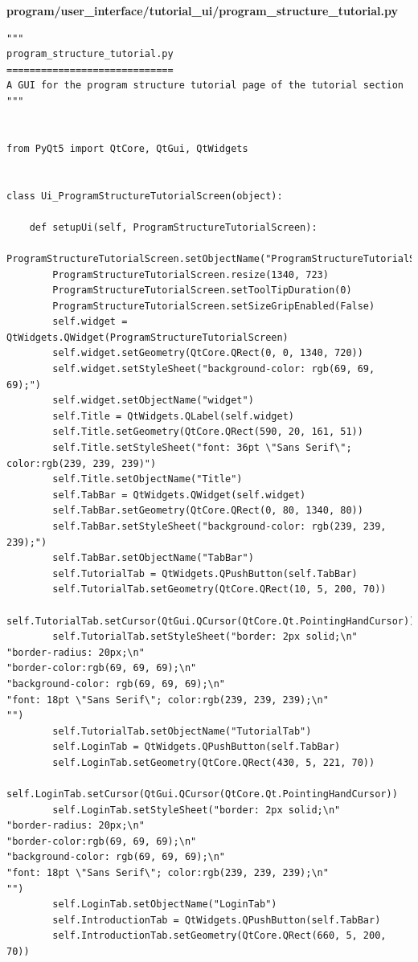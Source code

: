 \documentclass{article}
\begin{document}
\textbf{program/user\_interface/tutorial\_ui/program\_structure\_tutorial.py}
\begin{lstlisting}
"""
program_structure_tutorial.py
=============================
A GUI for the program structure tutorial page of the tutorial section
"""


from PyQt5 import QtCore, QtGui, QtWidgets


class Ui_ProgramStructureTutorialScreen(object):

    def setupUi(self, ProgramStructureTutorialScreen):
        ProgramStructureTutorialScreen.setObjectName("ProgramStructureTutorialScreen")
        ProgramStructureTutorialScreen.resize(1340, 723)
        ProgramStructureTutorialScreen.setToolTipDuration(0)
        ProgramStructureTutorialScreen.setSizeGripEnabled(False)
        self.widget = QtWidgets.QWidget(ProgramStructureTutorialScreen)
        self.widget.setGeometry(QtCore.QRect(0, 0, 1340, 720))
        self.widget.setStyleSheet("background-color: rgb(69, 69, 69);")
        self.widget.setObjectName("widget")
        self.Title = QtWidgets.QLabel(self.widget)
        self.Title.setGeometry(QtCore.QRect(590, 20, 161, 51))
        self.Title.setStyleSheet("font: 36pt \"Sans Serif\"; color:rgb(239, 239, 239)")
        self.Title.setObjectName("Title")
        self.TabBar = QtWidgets.QWidget(self.widget)
        self.TabBar.setGeometry(QtCore.QRect(0, 80, 1340, 80))
        self.TabBar.setStyleSheet("background-color: rgb(239, 239, 239);")
        self.TabBar.setObjectName("TabBar")
        self.TutorialTab = QtWidgets.QPushButton(self.TabBar)
        self.TutorialTab.setGeometry(QtCore.QRect(10, 5, 200, 70))
        self.TutorialTab.setCursor(QtGui.QCursor(QtCore.Qt.PointingHandCursor))
        self.TutorialTab.setStyleSheet("border: 2px solid;\n"
"border-radius: 20px;\n"
"border-color:rgb(69, 69, 69);\n"
"background-color: rgb(69, 69, 69);\n"
"font: 18pt \"Sans Serif\"; color:rgb(239, 239, 239);\n"
"")
        self.TutorialTab.setObjectName("TutorialTab")
        self.LoginTab = QtWidgets.QPushButton(self.TabBar)
        self.LoginTab.setGeometry(QtCore.QRect(430, 5, 221, 70))
        self.LoginTab.setCursor(QtGui.QCursor(QtCore.Qt.PointingHandCursor))
        self.LoginTab.setStyleSheet("border: 2px solid;\n"
"border-radius: 20px;\n"
"border-color:rgb(69, 69, 69);\n"
"background-color: rgb(69, 69, 69);\n"
"font: 18pt \"Sans Serif\"; color:rgb(239, 239, 239);\n"
"")
        self.LoginTab.setObjectName("LoginTab")
        self.IntroductionTab = QtWidgets.QPushButton(self.TabBar)
        self.IntroductionTab.setGeometry(QtCore.QRect(660, 5, 200, 70))

\end{lstlisting}
\end{document}
